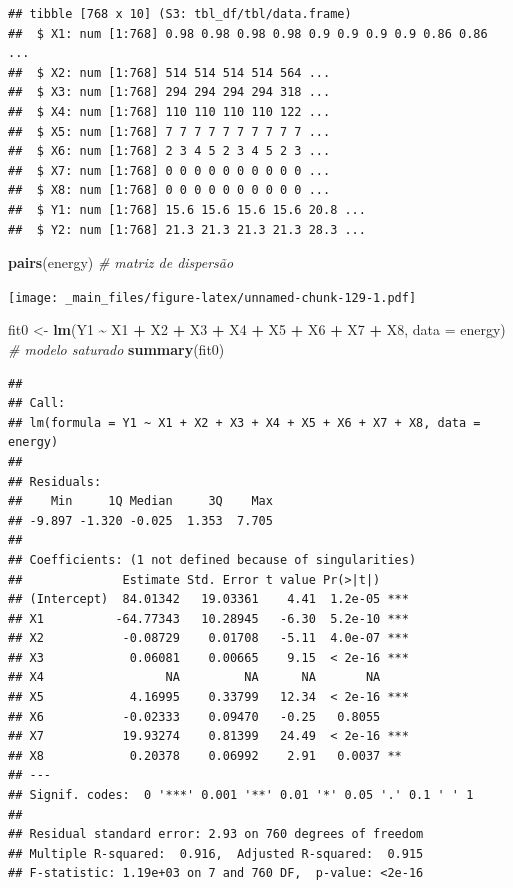 \documentclass[
]{book}
\newenvironment{Shaded}{\begin{snugshade}}{\end{snugshade}}
\newcommand{\CommentTok}[1]{\textcolor[rgb]{0.56,0.35,0.01}{\textit{#1}}}
\newcommand{\DataTypeTok}[1]{\textcolor[rgb]{0.13,0.29,0.53}{#1}}
\newcommand{\KeywordTok}[1]{\textcolor[rgb]{0.13,0.29,0.53}{\textbf{#1}}}
\newcommand{\NormalTok}[1]{#1}
\newcommand{\OperatorTok}[1]{\textcolor[rgb]{0.81,0.36,0.00}{\textbf{#1}}}
\newcommand{\StringTok}[1]{\textcolor[rgb]{0.31,0.60,0.02}{#1}}
\theoremstyle{definition}
\theoremstyle{definition}
\theoremstyle{definition}
\theoremstyle{remark}
\begin{document}
\begin{verbatim}
## tibble [768 x 10] (S3: tbl_df/tbl/data.frame)
##  $ X1: num [1:768] 0.98 0.98 0.98 0.98 0.9 0.9 0.9 0.9 0.86 0.86 ...
##  $ X2: num [1:768] 514 514 514 514 564 ...
##  $ X3: num [1:768] 294 294 294 294 318 ...
##  $ X4: num [1:768] 110 110 110 110 122 ...
##  $ X5: num [1:768] 7 7 7 7 7 7 7 7 7 7 ...
##  $ X6: num [1:768] 2 3 4 5 2 3 4 5 2 3 ...
##  $ X7: num [1:768] 0 0 0 0 0 0 0 0 0 0 ...
##  $ X8: num [1:768] 0 0 0 0 0 0 0 0 0 0 ...
##  $ Y1: num [1:768] 15.6 15.6 15.6 15.6 20.8 ...
##  $ Y2: num [1:768] 21.3 21.3 21.3 21.3 28.3 ...
\end{verbatim}

\begin{Shaded}
\begin{Highlighting}[]
\KeywordTok{pairs}\NormalTok{(energy) }\CommentTok{\# matriz de dispersão}
\end{Highlighting}
\end{Shaded}

\texttt{[image: \_main\_files/figure-latex/unnamed-chunk-129-1.pdf]}

\begin{Shaded}
\begin{Highlighting}[]
\NormalTok{fit0 \textless{}{-}}\StringTok{ }\KeywordTok{lm}\NormalTok{(Y1 }\OperatorTok{\textasciitilde{}}\StringTok{ }\NormalTok{X1 }\OperatorTok{+}\StringTok{ }\NormalTok{X2 }\OperatorTok{+}\StringTok{ }\NormalTok{X3 }\OperatorTok{+}\StringTok{ }\NormalTok{X4 }\OperatorTok{+}\StringTok{ }\NormalTok{X5 }\OperatorTok{+}\StringTok{ }\NormalTok{X6 }\OperatorTok{+}\StringTok{ }\NormalTok{X7 }\OperatorTok{+}\StringTok{ }\NormalTok{X8, }\DataTypeTok{data =}\NormalTok{ energy) }\CommentTok{\# modelo saturado}
\KeywordTok{summary}\NormalTok{(fit0)}
\end{Highlighting}
\end{Shaded}

\begin{verbatim}
## 
## Call:
## lm(formula = Y1 ~ X1 + X2 + X3 + X4 + X5 + X6 + X7 + X8, data = energy)
## 
## Residuals:
##    Min     1Q Median     3Q    Max 
## -9.897 -1.320 -0.025  1.353  7.705 
## 
## Coefficients: (1 not defined because of singularities)
##              Estimate Std. Error t value Pr(>|t|)    
## (Intercept)  84.01342   19.03361    4.41  1.2e-05 ***
## X1          -64.77343   10.28945   -6.30  5.2e-10 ***
## X2           -0.08729    0.01708   -5.11  4.0e-07 ***
## X3            0.06081    0.00665    9.15  < 2e-16 ***
## X4                 NA         NA      NA       NA    
## X5            4.16995    0.33799   12.34  < 2e-16 ***
## X6           -0.02333    0.09470   -0.25   0.8055    
## X7           19.93274    0.81399   24.49  < 2e-16 ***
## X8            0.20378    0.06992    2.91   0.0037 ** 
## ---
## Signif. codes:  0 '***' 0.001 '**' 0.01 '*' 0.05 '.' 0.1 ' ' 1
## 
## Residual standard error: 2.93 on 760 degrees of freedom
## Multiple R-squared:  0.916,  Adjusted R-squared:  0.915 
## F-statistic: 1.19e+03 on 7 and 760 DF,  p-value: <2e-16
\end{verbatim}
\end{document}
